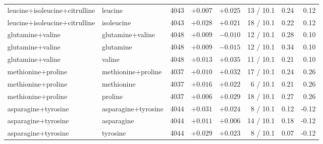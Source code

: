 \begin{table}[H]
\begin{tabular}{@{}llrrrrrr@{}}
    leucine+isoleucine+citrulline & leucine & 4043 & $+0.007$ & $+0.025$ & 13 / 10.1 & 0.24 & 0.12 \\
    leucine+isoleucine+citrulline & isoleucine & 4043 & $+0.028$ & $+0.021$ & 18 / 10.1 & 0.22 & 0.12 \\
    glutamine+valine & glutamine+valine & 4048 & $+0.009$ & $-0.010$ & 12 / 10.1 & 0.28 & 0.10 \\
    glutamine+valine & glutamine & 4048 & $+0.009$ & $-0.015$ & 12 / 10.1 & 0.34 & 0.10 \\
    glutamine+valine & valine & 4048 & $+0.013$ & $+0.035$ & 11 / 10.1 & 0.21 & 0.10 \\
    methionine+proline & methionine+proline & 4037 & $+0.010$ & $+0.032$ & 17 / 10.1 & 0.24 & 0.26 \\
    methionine+proline & methionine & 4037 & $+0.016$ & $+0.022$ & 6 / 10.1 & 0.21 & 0.26 \\
    methionine+proline & proline & 4037 & $+0.006$ & $+0.029$ & 18 / 10.1 & 0.27 & 0.26 \\
    asparagine+tyrosine & asparagine+tyrosine & 4044 & $+0.031$ & $+0.024$ & 8 / 10.1 & 0.12 & -0.12 \\
    asparagine+tyrosine & asparagine & 4044 & $+0.011$ & $+0.006$ & 14 / 10.1 & 0.18 & -0.12 \\
    asparagine+tyrosine & tyrosine & 4044 & $+0.029$ & $+0.023$ & 8 / 10.1 & 0.07 & -0.12 \\
    \hline
  \end{tabular}
\end{table}
